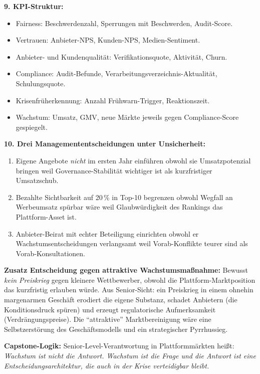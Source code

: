 \documentclass[11pt,a4paper,oneside]{article}
\begin{document}
\begin{loesungbox}
\textbf{9. KPI-Struktur:}
\begin{itemize}
  \item Fairness: Beschwerdenzahl, Sperrungen mit Beschwerden, Audit-Score.
  \item Vertrauen: Anbieter-NPS, Kunden-NPS, Medien-Sentiment.
  \item Anbieter- und Kundenqualität: Verifikationsquote, Aktivität, Churn.
  \item Compliance: Audit-Befunde, Verarbeitungsverzeichnis-Aktualität, Schulungsquote.
  \item Krisenfrüherkennung: Anzahl Frühwarn-Trigger, Reaktionszeit.
  \item Wachstum: Umsatz, GMV, neue Märkte \textendash{} jeweils gegen Compliance-Score gespiegelt.
\end{itemize}

\textbf{10. Drei Managemententscheidungen unter Unsicherheit:}
\begin{enumerate}
  \item Eigene Angebote \emph{nicht} im ersten Jahr einführen \textendash{} obwohl sie Umsatzpotenzial bringen \textendash{} weil Governance-Stabilität wichtiger ist als kurzfristiger Umsatzschub.
  \item Bezahlte Sichtbarkeit auf 20\,\% in Top-10 begrenzen \textendash{} obwohl Wegfall an Werbeumsatz spürbar wäre \textendash{} weil Glaubwürdigkeit des Rankings das Plattform-Asset ist.
  \item Anbieter-Beirat mit echter Beteiligung einrichten \textendash{} obwohl er Wachstumsentscheidungen verlangsamt \textendash{} weil Vorab-Konflikte teurer sind als Vorab-Konsultationen.
\end{enumerate}

\smallskip
\textbf{Zusatz \textendash{} Entscheidung gegen attraktive Wachstumsmaßnahme:} Bewusst \emph{kein Preiskrieg} gegen kleinere Wettbewerber, obwohl die Plattform-Marktposition das kurzfristig erlauben würde. Aus Senior-Sicht: ein Preiskrieg in einem ohnehin margenarmen Geschäft erodiert die eigene Substanz, schadet Anbietern (die Konditionsdruck spüren) und erzeugt regulatorische Aufmerksamkeit (Verdrängungspreise). Die ``attraktive'' Marktbereinigung wäre eine Selbstzerstörung des Geschäftsmodells und ein strategischer Pyrrhussieg.

\smallskip
\textbf{Capstone-Logik:} Senior-Level-Verantwortung in Plattformmärkten heißt: \emph{Wachstum ist nicht die Antwort. Wachstum ist die Frage \textendash{} und die Antwort ist eine Entscheidungsarchitektur, die auch in der Krise verteidigbar bleibt.}
\end{loesungbox}
\end{document}

